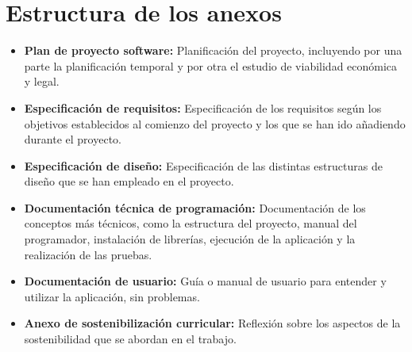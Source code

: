 \section{Estructura de los anexos}
\begin{itemize}
\tightlist
    \item 
        \textbf{Plan de proyecto software:} Planificación del proyecto, incluyendo por una parte la planificación temporal y por otra el estudio de viabilidad económica y legal.
    \item 
        \textbf{Especificación de requisitos:} Especificación de los requisitos según los objetivos establecidos al comienzo del proyecto y los que se han ido añadiendo durante el proyecto.
    \item 
        \textbf{Especificación de diseño:} Especificación de las distintas estructuras de diseño que se han empleado en el proyecto.
    \item 
        \textbf{Documentación técnica de programación:} Documentación de los conceptos más técnicos, como la estructura del proyecto, manual del programador, instalación de librerías, ejecución de la aplicación y la realización de las pruebas.
    \item 
        \textbf{Documentación de usuario:} Guía o manual de usuario para entender y utilizar la aplicación, sin problemas.
    \item 
        \textbf{Anexo de sostenibilización curricular:} Reflexión sobre los aspectos de la sostenibilidad que se abordan en el trabajo.
\end{itemize}